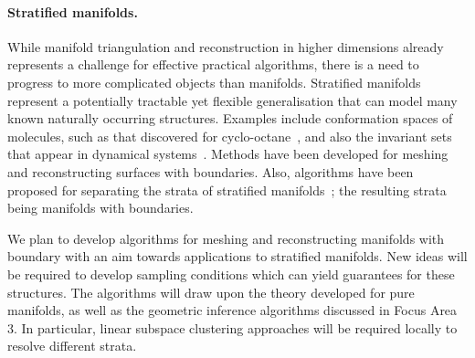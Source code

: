 \paragraph{Stratified manifolds.}

While manifold triangulation and reconstruction in higher dimensions
already represents a challenge for effective practical algorithms,
there is a need to progress to more complicated objects than
manifolds. Stratified manifolds represent a potentially tractable yet
flexible generalisation that can model many known naturally occurring
structures. Examples include conformation spaces of molecules, such as
that discovered for cyclo-octane~\cite{mtcw-tco-2010}, and also the
invariant sets that appear in dynamical systems~\cite{mh-mpc-2002}.
%
Methods have been developed for meshing and reconstructing surfaces
with boundaries. Also, algorithms have been proposed for separating
the strata of stratified manifolds~\cite{bendich2007}; the resulting
strata being manifolds with boundaries. 

We plan to develop algorithms for meshing and reconstructing manifolds
with boundary with an aim towards applications to stratified
manifolds. 
New ideas will be required to develop sampling conditions which can
yield guarantees for these structures. The algorithms will draw upon
the theory developed for pure manifolds, as well as the geometric
inference algorithms discussed in Focus Area 3. In particular, linear
subspace clustering approaches will be required locally to resolve
different strata.
